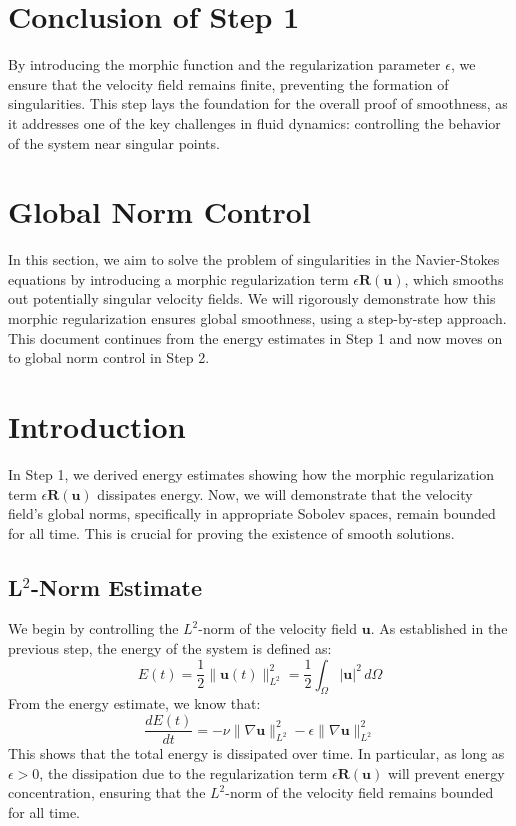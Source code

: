 \documentclass{article}
\begin{document}
\section*{Conclusion of Step 1}

By introducing the morphic function and the regularization parameter \( \epsilon \), we ensure that the velocity field remains finite, preventing the formation of singularities. This step lays the foundation for the overall proof of smoothness, as it addresses one of the key challenges in fluid dynamics: controlling the behavior of the system near singular points.

\section*{Global Norm Control}

In this section, we aim to solve the problem of singularities in the Navier-Stokes equations by introducing a morphic regularization term \( \epsilon \mathbf{R}(\mathbf{u}) \), which smooths out potentially singular velocity fields. We will rigorously demonstrate how this morphic regularization ensures global smoothness, using a step-by-step approach. This document continues from the energy estimates in Step 1 and now moves on to global norm control in Step 2.

\section{Introduction}

In Step 1, we derived energy estimates showing how the morphic regularization term \( \epsilon \mathbf{R}(\mathbf{u}) \) dissipates energy. Now, we will demonstrate that the velocity field's global norms, specifically in appropriate Sobolev spaces, remain bounded for all time. This is crucial for proving the existence of smooth solutions.

\subsection*{L\(^2\)-Norm Estimate}

We begin by controlling the \( L^2 \)-norm of the velocity field \( \mathbf{u} \). As established in the previous step, the energy of the system is defined as:
\[
E(t) = \frac{1}{2} \|\mathbf{u}(t)\|_{L^2}^2 = \frac{1}{2} \int_{\Omega} |\mathbf{u}|^2 \, d\Omega
\]
From the energy estimate, we know that:
\[
\frac{dE(t)}{dt} = -\nu \|\nabla \mathbf{u}\|_{L^2}^2 - \epsilon \|\nabla \mathbf{u}\|_{L^2}^2
\]
This shows that the total energy is dissipated over time. In particular, as long as \( \epsilon > 0 \), the dissipation due to the regularization term \( \epsilon \mathbf{R}(\mathbf{u}) \) will prevent energy concentration, ensuring that the \( L^2 \)-norm of the velocity field remains bounded for all time.
\end{document}
